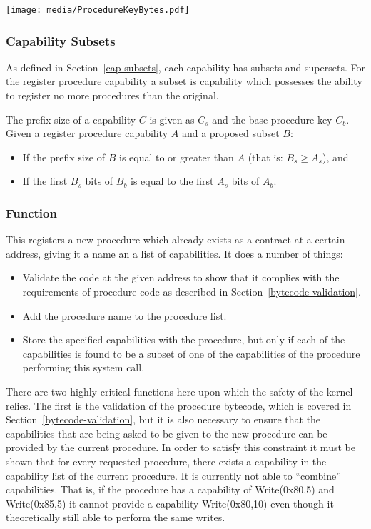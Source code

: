 \documentclass[english,a4paper]{article}
\let\oldparagraph\subsubsection
\renewcommand{\subsubsection}[1]{\oldparagraph{#1}\mbox{}}
\begin{document}
\texttt{[image: media/ProcedureKeyBytes.pdf]}

\subsubsection{Capability Subsets}
As defined in Section~\ref{cap-subsets}, each capability has subsets and
supersets. For the register procedure capability a subset is capability which
possesses the ability to register no more procedures than the original.

The prefix size of a capability $C$ is given as $C_s$ and the base procedure key
$C_b$. Given a register procedure capability $A$ and a proposed subset $B$:
\begin{itemize}
  \item If the prefix size of $B$ is equal to or greater than $A$ (that is: $B_s
  \geq A_s$), and
  \item If the first $B_s$ bits of $B_b$ is equal to the first $A_s$ bits of
  $A_b$.
\end{itemize}

\subsubsection{Function}
This registers a new procedure which already exists as a contract at a certain
address, giving it a name an a list of capabilities. It does a number of things:

\begin{itemize}
  \item Validate the code at the given address to show that it complies with the
  requirements of procedure code as described in
  Section~\ref{bytecode-validation}.
  \item Add the procedure name to the procedure list.
  \item Store the specified capabilities with the procedure, but only if each of
  the capabilities is found to be a subset of one of the capabilities of the
  procedure performing this system call.
\end{itemize}

There are two highly critical functions here upon which the safety of the kernel
relies. The first is the validation of the procedure bytecode, which is covered
in Section~\ref{bytecode-validation}, but it is also necessary to ensure that
the capabilities that are being asked to be given to the new procedure can be
provided by the current procedure. In order to satisfy this constraint it must
be shown that for every requested procedure, there exists a capability in the
capability list of the current procedure. It is currently not able to
``combine'' capabilities. That is, if the procedure has a capability of
Write(0x80,5) and Write(0x85,5) it cannot provide a capability Write(0x80,10)
even though it theoretically still able to perform the same writes.
\end{document}
